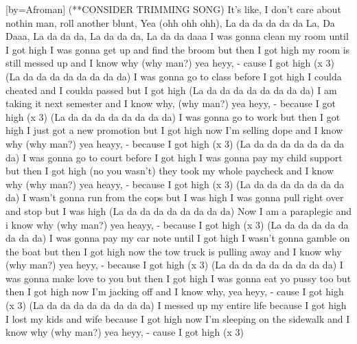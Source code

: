 [by={Afroman}]
\beginverse*\singlespacing (**CONSIDER TRIMMING SONG)
It's like, I don't care about nothin man,
roll another blunt, Yea (ohh ohh ohh),
\endverse
\beginverse*\singlespacing
La da da da da da La, Da Daaa,
La da da da, La da da da, La da da daaa
\endverse
\beginverse*\singlespacing
I was gonna clean my room until I got high
I was gonna get up and find the broom but then I got high
my room is still messed up and I know why (why man?) yea heyy,
- cause I got high (x 3)
\endverse
\beginverse*\singlespacing
(La da da da da da da da da)
\endverse
\beginverse*\singlespacing
I was gonna go to class before I got high
I coulda cheated and I coulda passed but I got high
(La da da da da da da da da)
I am taking it next semester and I know why, (why man?) yea heyy,
- because I got high (x 3)
\endverse
\beginverse*\singlespacing
(La da da da da da da da da)
\endverse
\beginverse*\singlespacing
I was gonna go to work but then I got high
I just got a new promotion but I got high
now I'm selling dope and I know why (why man?) yea heayy,
- because I got high (x 3)
\endverse
\beginverse*\singlespacing
(La da da da da da da da da)
\endverse
\beginverse*\singlespacing
I was gonna go to court before I got high
I was gonna pay my child support but then I got high (no you wasn't)
they took my whole paycheck and I know why (why man?) yea heayy,
- because I got high (x 3)
\endverse
\beginverse*\singlespacing
(La da da da da da da da da)
\endverse
\beginverse*\singlespacing
I wasn't gonna run from the cops but I was high
I was gonna pull right over and stop but I was high
(La da da da da da da da da)
Now I am a paraplegic and i know why (why man?) yea heayy,
- because I got high (x 3)
\endverse
\beginverse*\singlespacing
(La da da da da da da da da)
\endverse
\beginverse*\singlespacing
I was gonna pay my car note until I got high
I wasn't gonna gamble on the boat but then I got high
now the tow truck is pulling away and I know why (why man?) yea heyy,
- because I got high (x 3)
\endverse
\beginverse*\singlespacing
(La da da da da da da da da)
\endverse
\beginverse*\singlespacing
I was gonna make love to you but then I got high
I was gonna eat yo pussy too but then I got high
now I'm jacking off and I know why, yea heyy,
- cause I got high (x 3)
\endverse
\beginverse*\singlespacing
(La da da da da da da da da)
\endverse
\beginverse*\singlespacing
I messed up my entire life because I got high
I lost my kids and wife because I got high
now I'm sleeping on the sidewalk and I know why (why man?) yea heyy,
- cause I got high (x 3)
\endverse
\beginverse*\singlespacing
